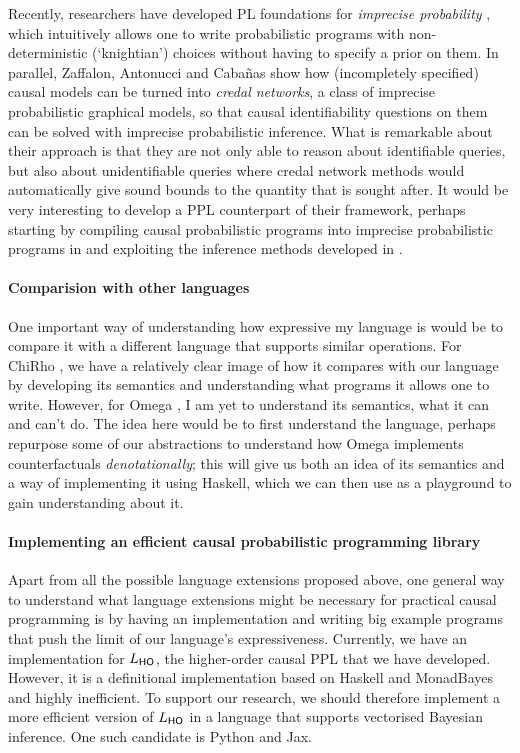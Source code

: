 \documentclass[11pt,a4paper]{article}
\begin{document}
Recently, researchers have developed PL foundations for \emph{imprecise probability} \cite{liell2025compositional, LiellCock2026}, which intuitively allows one to write probabilistic programs with non-deterministic (`knightian') choices without having to specify a prior on them. In parallel, Zaffalon, Antonucci and Caba\~nas \cite{zaffalon20a} show how (incompletely specified) causal models can be turned into \emph{credal networks}, a class of imprecise probabilistic graphical models, so that causal identifiability questions on them can be solved with imprecise probabilistic inference. What is remarkable about their approach is that they are not only able to reason about identifiable queries, but also about unidentifiable queries where credal network methods would automatically give sound bounds to the quantity that is sought after. It would be very interesting to develop a PPL counterpart of their framework, perhaps starting by compiling causal probabilistic programs into imprecise probabilistic programs in \cite{liell2025compositional} and exploiting the inference methods developed in \cite{LiellCock2026}. 

\paragraph{Comparision with other languages} One important way of understanding how expressive my language is would be to compare it with a different language that supports similar operations. For ChiRho \cite{chirho}, we have a relatively clear image of how it compares with our language by developing its semantics \cite{lafi-wang} and understanding what programs it allows one to write. However, for Omega \cite{tavares2021language}, I am yet to understand its semantics, what it can and can't do. The idea here would be to first understand the language, perhaps repurpose some of our abstractions to understand how Omega implements counterfactuals \emph{denotationally}; this will give us both an idea of its semantics and a way of implementing it using Haskell, which we can then use as a playground to gain understanding about it. 

\paragraph{Implementing an efficient causal probabilistic programming library} Apart from all the possible language extensions proposed above, one general way to understand what language extensions might be necessary for practical causal programming is by having an implementation and writing big example programs that push the limit of our language's expressiveness. Currently, we have an implementation for $L_{\mathsf{HO}}$, the higher-order causal PPL that we have developed. However, it is a definitional implementation based on Haskell and MonadBayes \cite{monadbayes1,monadbayes2,monadbayes3} and highly inefficient. To support our research, we should therefore implement a more efficient version of $L_{\mathsf{HO}}$ in a language that supports vectorised Bayesian inference. One such candidate is Python and Jax. 
\end{document}
